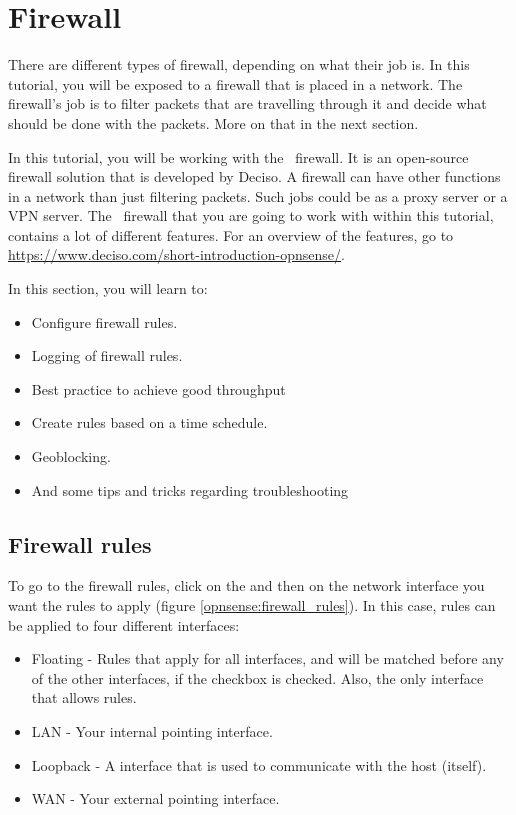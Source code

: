 \newpage

\section{Firewall}
There are different types of firewall, depending on what their job is. In this tutorial, you will be exposed to a firewall that is placed in a network. The firewall's job is to filter packets that are travelling through it and decide what should be done with the packets. More on that in the next section.

In this tutorial, you will be working with the \opnsense\ firewall. It is an open-source firewall solution that is developed by Deciso. A firewall can have other functions in a network than just filtering packets. Such jobs could be as a proxy server or a VPN server. The \opnsense\ firewall that you are going to work with within this tutorial, contains a lot of different features. For an overview of the features, go to \url{https://www.deciso.com/short-introduction-opnsense/}.


In this section, you will learn to:
\begin{itemize}
    \item Configure firewall rules.
    \item Logging of firewall rules.
    \item Best practice to achieve good throughput
    \item Create rules based on a time schedule.
    \item Geoblocking.
    \item And some tips and tricks regarding troubleshooting
\end{itemize}

\subsection{Firewall rules}
To go to the firewall rules, click on the  and then on the network interface you want the rules to apply (figure \ref{opnsense:firewall_rules}). In this case, rules can be applied to four different interfaces:
\begin{itemize}
    \item Floating - Rules that apply for all interfaces, and will be matched before any of the other interfaces, if the  checkbox is checked. Also, the only interface that allows  rules.
    \item LAN - Your internal pointing interface.
    \item Loopback - A interface that is used to communicate with the host (itself).
    \item WAN - Your external pointing interface.
\end{itemize}

